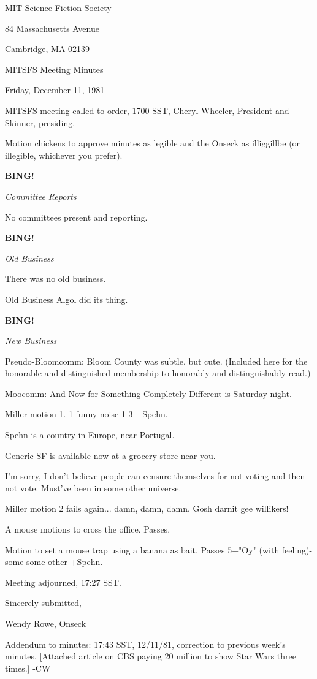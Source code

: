 \documentclass[12pt]{article}
\newcommand{\bing}{{\bf BING!} }
\newcommand{\goto}[1]{\bing \vskip 12pt \centerline{{\em{#1}}}}
\begin{document}
\begin{center}

MIT Science Fiction Society 

84 Massachusetts Avenue

Cambridge, MA 02139

\vspace{12pt}

MITSFS Meeting Minutes 

Friday, December 11, 1981

\end{center}
 
\vspace{18pt}

\setlength{\parskip}{6pt}

\noindent
MITSFS meeting called to order, 1700 SST,
Cheryl Wheeler, President and Skinner, presiding.

Motion chickens to approve minutes as legible and the Onseck as illiggillbe (or illegible, whichever you prefer).

\goto{Committee Reports}

No committees present and reporting.

\goto{Old Business}

There was no old business.

Old Business Algol did its thing.

\goto{New Business}

Pseudo-Bloomcomm: Bloom County was subtle, but cute. (Included here for the honorable and distinguished membership to honorably and distinguishably read.)

Moocomm: And Now for Something Completely Different is Saturday night.

Miller motion 1. 1 funny noise-1-3 +Spehn.

Spehn is a country in Europe, near Portugal.

Generic SF is available now at a grocery store near you.

I'm sorry, I don't believe people can censure themselves for not voting and then not vote. Must've been in some other universe.

Miller motion 2 fails again... damn, damn, damn. Gosh darnit gee willikers!

A mouse motions to cross the office. Passes.

Motion to set a mouse trap using a banana as bait. Passes 5+"Oy" (with feeling)-some-some other +Spehn.

\vspace{12pt}

\noindent
Meeting adjourned, 17:27 SST.

\vspace{18pt}

\centerline{Sincerely submitted,}
\centerline{Wendy Rowe, Onseck}

Addendum to minutes: 17:43 SST, 12/11/81, correction to previous week's minutes. [Attached article on CBS paying 20 million to show Star Wars three times.] -CW
\end{document}
